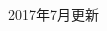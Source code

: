 \documentclass[margin]{res}
\begin{document}
\begin{CJK}{UTF8}{gbsn}
\begin{resume}


\end{resume} 
\hfill \small{2017年7月更新}
\end{CJK}
\end{document}
